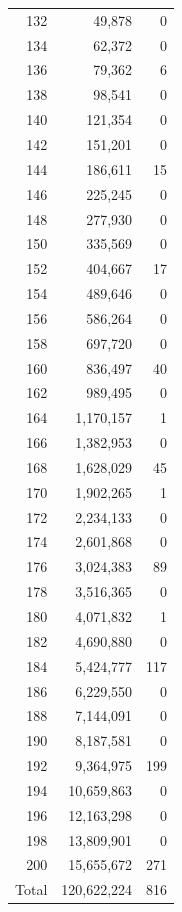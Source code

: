 \documentclass[11pt]{amsart}
\begin{document}
\begin{longtable}{rrr}
132 & 49,878 & 0 \\
134 & 62,372 & 0 \\
136 & 79,362 & 6 \\
138 & 98,541 & 0 \\
140 & 121,354 & 0 \\
142 & 151,201 & 0 \\
144 & 186,611 & 15 \\
146 & 225,245 & 0 \\
148 & 277,930 & 0 \\
150 & 335,569 & 0 \\
152 & 404,667 & 17 \\
154 & 489,646 & 0 \\
156 & 586,264 & 0 \\
158 & 697,720 & 0 \\
160 & 836,497 & 40 \\
162 & 989,495 & 0 \\
164 & 1,170,157 & 1 \\
166 & 1,382,953 & 0 \\
168 & 1,628,029 & 45 \\
170 & 1,902,265 & 1 \\
172 & 2,234,133 & 0 \\
174 & 2,601,868 & 0 \\
176 & 3,024,383 & 89 \\
178 & 3,516,365 & 0 \\
180 & 4,071,832 & 1 \\
182 & 4,690,880 & 0 \\
184 & 5,424,777 & 117 \\
186 & 6,229,550 & 0 \\
188 & 7,144,091 & 0 \\
190 & 8,187,581 & 0 \\
192 & 9,364,975 & 199 \\
194 & 10,659,863 & 0 \\
196 & 12,163,298 & 0 \\
198 & 13,809,901 & 0 \\
200 & 15,655,672 & 271 \\
\midrule Total & 120,622,224 & 816\\\bottomrule
\end{longtable}
\end{document}
